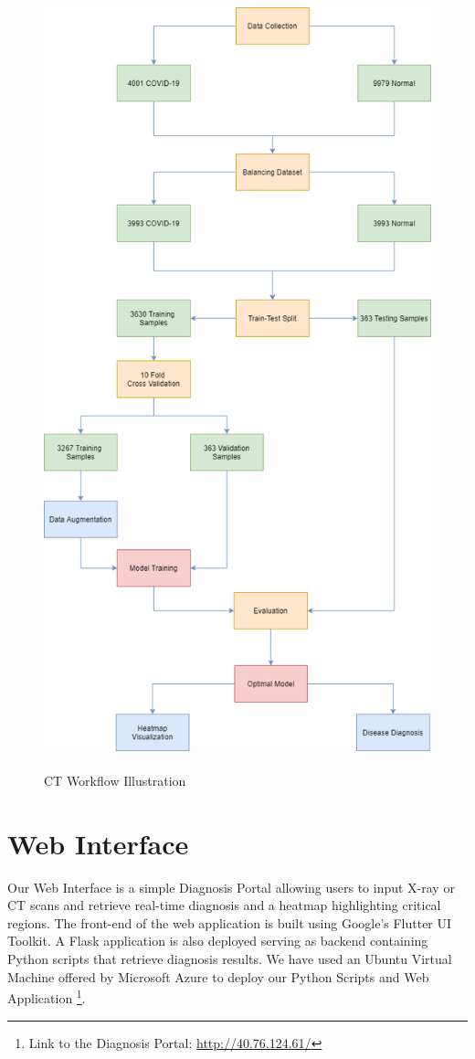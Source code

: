 \begin{figure}[H]
	\centering
	\includegraphics[width=13cm, height= 22.5cm]{Images/CT Workflow.png}

	\caption{\small CT Workflow Illustration}
	\label{fig:CT Illustration}
\end{figure}


\section{Web Interface}

Our Web Interface is a simple Diagnosis Portal allowing users to input X-ray or CT scans and retrieve real-time diagnosis and a heatmap highlighting critical regions. The front-end of the web application is built using Google's Flutter UI Toolkit. A Flask application is also deployed serving as backend containing Python scripts that retrieve diagnosis results. We have used an Ubuntu Virtual Machine offered by Microsoft Azure to deploy our Python Scripts and Web Application \footnote{Link to the Diagnosis Portal: \url{http://40.76.124.61/}}.

